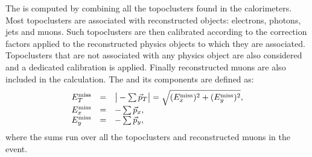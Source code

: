 The \met{} is computed by combining all the topoclusters found in the
calorimeters. Most topoclusters are associated with reconstructed
objects: electrons, photons, jets and muons. Such topoclusters are then
calibrated according to the correction factors applied to the
reconstructed physics objects to which they are
associated. Topoclusters that are not associated with any physics
object are also considered and a dedicated calibration is applied.
Finally reconstructed muons are also included in the \met{} calculation.
The \met{} and its components are defined as:
\begin{equation}\label{eq:met}
\begin{array}{lcl}
E^{\rm miss}_{T} & = & \big|-\sum\vec{p}_T \big| = \sqrt{(E^{\rm miss}_{x})^2 + (E^{\rm miss}_{y})^2} ,\\
E^{\rm miss}_{x} & = & -\sum\vec{p}_x ,\\
E^{\rm miss}_{y} & = & -\sum\vec{p}_y ,\\
\end{array}	\end{equation}
where the sums run over all the topoclusters and reconstructed muons in the event.
